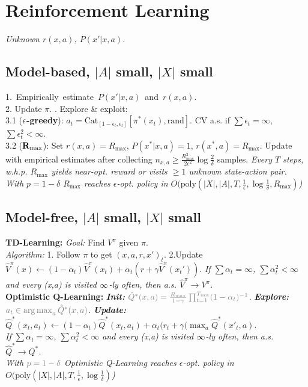 \section{Reinforcement Learning}
\emph{Unknown $r(x,a)$, $P(x'|x,a)$.}
\subsection{Model-based, $|A|$ small, $|X|$ small}
\mbox{1. Empirically estimate $P(x'|x,a)$ and $r(x,a)$.}\\
2. Update $\pi$. . Explore \& exploit:\\
3.1 ($\color{black}\mathbf{\epsilon}$\textbf{-greedy}): $a_t=\mathrm{Cat}_{[1-\epsilon_t, \epsilon_t]}[\pi^*(x_t),\mathrm{rand}]$. CV a.s. if $\sum \epsilon_t = \infty$, $\sum \epsilon^2_t < \infty$.\\
3.2 ($\color{black}\mathbf{R_{\max}}$): Set $r(x,a)=R_{\max}$, $P(x^*|x,a)=1$, $r(x^*,a)=R_{\max}$. Update with empirical estimates after collecting $n_{x,a} \geq \frac{R_{\max}^2}{2\epsilon^2}\log\frac{2}{\delta}$ samples. \emph{Every $T$ steps, w.h.p. $R_{\max}$ yields near-opt. reward or visits $\geq 1$ unknown state-action pair.\\}
\emph{With $p=1-\delta$ $R_{\max}$ reaches $\epsilon$-opt. policy in $O(\mathrm{poly}(|X|,|A|,T,\frac{1}{\epsilon},\log\frac{1}{\delta}, R_{\max})$)}
\subsection{Model-free, $|A|$ small, $|X|$ small}
\textbf{TD-Learning:} \emph{Goal:} Find $V^\pi$ given $\pi$.\\
\emph{Algorithm:} 1. Follow $\pi$ to get $(x,a,r,x')_t$. 2.Update $\hat{V}^\pi(x) \leftarrow (1-\alpha_t)\hat{V}^\pi(x_t) + \alpha_t (r + \gamma\hat{V}^\pi(x_t'))$.
\emph{If $\sum\alpha_t=\infty$, $\sum\alpha_t^2<\infty$ and every (x,a) is visited $\color{black}\infty$-ly often, then a.s. $\hat{V}^\pi \to V^\pi$.}\\
\textbf{{\color{gray} Optimistic} Q-Learning:} {\color{gray} \emph{\textbf{Init:}} $\color{gray}\hat{Q}^*(x,a) = \frac{R_{\max}}{1-\gamma}\prod_{t=1}^{T_\mathrm{init}}(1-\alpha_t)^{-1}$}.
\emph{\color{gray}\textbf{Explore:}} $\color{gray}a_t \in \argmax_a \hat{Q}^*(x,a)$. \emph{\textbf{Update:}} $\hat{Q}^*(x_t,a_t) \leftarrow (1-\alpha_t)\hat{Q}^*(x_t,a_t) + \alpha_t(r_t + \gamma(\max_a\hat{Q}^*(x'_t,a)$.\\
\emph{If $\sum\alpha_t=\infty$, $\sum\alpha_t^2<\infty$ and every (x,a) is visited $\color{black}\infty$-ly often, then a.s. $\hat{Q}^* \to Q^*$.}\\
\emph{\color{gray} With $\color{gray}p=1-\delta$ Optimistic Q-Learning reaches $\epsilon$-opt. policy in $O(\mathrm{poly}(|X|,|A|,T,\frac{1}{\epsilon},\log\frac{1}{\delta})$)}

